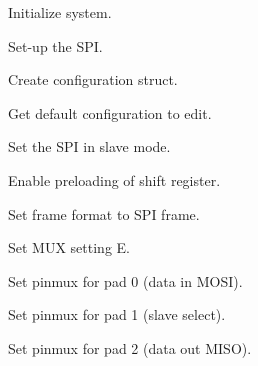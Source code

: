 \begin{DoxyEnumerate}
\item Initialize system. 
\begin{DoxyCodeInclude}{0}
\end{DoxyCodeInclude}

\item Set-\/up the S\+PI. 
\begin{DoxyCodeInclude}{0}
\end{DoxyCodeInclude}

\begin{DoxyEnumerate}
\item Create configuration struct. 
\begin{DoxyCodeInclude}{0}
\end{DoxyCodeInclude}

\item Get default configuration to edit. 
\begin{DoxyCodeInclude}{0}
\end{DoxyCodeInclude}

\item Set the S\+PI in slave mode. 
\begin{DoxyCodeInclude}{0}
\end{DoxyCodeInclude}

\item Enable preloading of shift register. 
\begin{DoxyCodeInclude}{0}
\end{DoxyCodeInclude}

\item Set frame format to S\+PI frame. 
\begin{DoxyCodeInclude}{0}
\end{DoxyCodeInclude}

\item Set M\+UX setting E. 
\begin{DoxyCodeInclude}{0}
\end{DoxyCodeInclude}

\item Set pinmux for pad 0 (data in M\+O\+SI). 
\begin{DoxyCodeInclude}{0}
\end{DoxyCodeInclude}

\item Set pinmux for pad 1 (slave select). 
\begin{DoxyCodeInclude}{0}
\end{DoxyCodeInclude}

\item Set pinmux for pad 2 (data out M\+I\+SO). 
\begin{DoxyCodeInclude}{0}
\end{DoxyCodeInclude}


\end{DoxyEnumerate}
\end{DoxyEnumerate}
